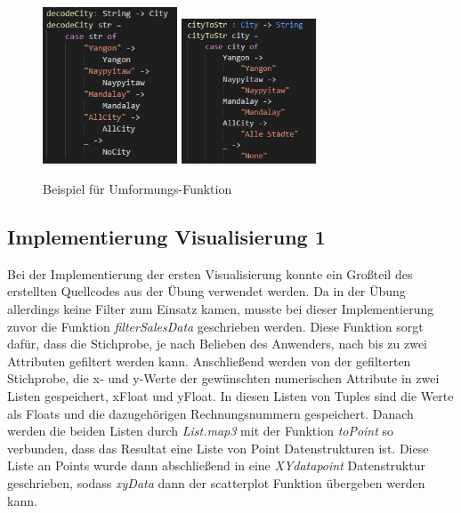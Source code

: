 \documentclass[usegeometry=true]{scrartcl}
\begin{document}
\begin{figure} [H]
	\begin{center}
		\includegraphics[width=4cm]{IMG/StrToCity}
		\includegraphics[width=4cm]{IMG/cityToStr}
		\caption{Beispiel für Umformungs-Funktion}
		\label{fig:Umformung}
	\end{center}
\end{figure}

\subsection{Implementierung Visualisierung 1}\label{Implementierung1}
Bei der Implementierung der ersten Visualisierung konnte ein Großteil des erstellten Quellcodes aus der Übung verwendet werden. Da in der Übung allerdings keine Filter zum
Einsatz kamen, musste bei dieser Implementierung zuvor die Funktion \textit{filterSalesData} geschrieben werden. Diese Funktion sorgt dafür, dass die Stichprobe, je nach
Belieben des Anwenders, nach bis zu zwei Attributen gefiltert werden kann. Anschließend werden von der gefilterten Stichprobe, die x- und y-Werte der gewünschten numerischen
Attribute in zwei Listen gespeichert, xFloat und yFloat. In diesen Listen von Tuples sind die Werte als Floats und die dazugehörigen Rechnungsnummern gespeichert. Danach
werden die beiden Listen durch \textit{List.map3} mit der Funktion \textit{toPoint} so verbunden, dass das Resultat eine Liste von Point Datenstrukturen ist. Diese Liste an
Points wurde dann abschließend in eine \textit{XYdatapoint} Datenstruktur geschrieben, sodass \textit{xyData} dann der scatterplot Funktion übergeben werden kann.
\end{document}
